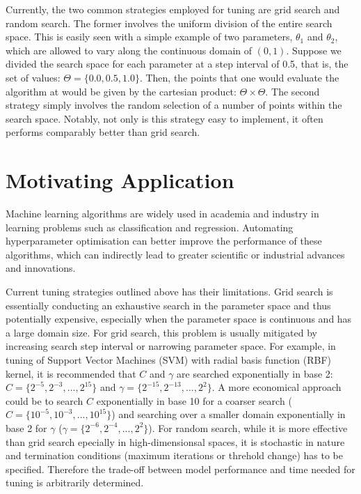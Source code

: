 \documentclass[letterpaper]{article}
\begin{document}
Currently, the two common strategies employed for tuning are grid search and
random search. The former involves the uniform division of the entire search
space. This is easily seen with a simple example of two parameters, $\theta_1$ and
$\theta_2$, which are allowed to vary along the continuous domain of $(0, 1)$.
Suppose we divided the search space for each parameter at a step interval of 0.5,
that is, the set of values: $\Theta=\{0.0, 0.5, 1.0\}$. Then, the points that one
would evaluate the algorithm at would be given by the cartesian product: $\Theta \times \Theta$.
The second strategy simply involves the random selection of a number of points
within the search space. Notably, not only is this strategy easy to implement, it
often performs comparably better than grid search.

\section{Motivating Application}
Machine learning algorithms are widely used in academia and industry in learning
problems such as classification and regression. Automating hyperparameter optimisation
can better improve the performance of these algorithms, which can indirectly lead
to greater scientific or industrial advances and innovations.

Current tuning strategies outlined above has their limitations. Grid search is essentially
conducting an exhaustive search in the parameter space and thus potentially expensive,
especially when the parameter space is continuous and has a large domain size. For
grid search, this problem is usually mitigated by increasing search step interval
or narrowing parameter space. For example, in tuning of Support Vector Machines
(SVM) with radial basis function (RBF) kernel, it is recommended that $\textit{C}$ and $\gamma$ are searched
exponentially in base 2: $\textit{C}=\{2^{-5},2^{-3},...,2^{15}\}$ and
$\gamma=\{2^{-15},2^{-13},...,2^{2}\}$. A more economical approach could be to search
$\textit{C}$ exponentially in base 10 for a coarser search
($\textit{C}=\{10^{-5},10^{-3},...,10^{15}\}$) and searching over a smaller domain
exponentially in base 2 for $\gamma$ ($\gamma=\{2^{-6},2^{-4},...,2^{2}\}$). For random
search, while it is more effective than grid search epecially in high-dimensionsal spaces,
it is stochastic in nature and termination conditions (maximum iterations or threhold change)
has to be specified. Therefore the trade-off between model performance and time needed
for tuning is arbitrarily determined.
\end{document}
